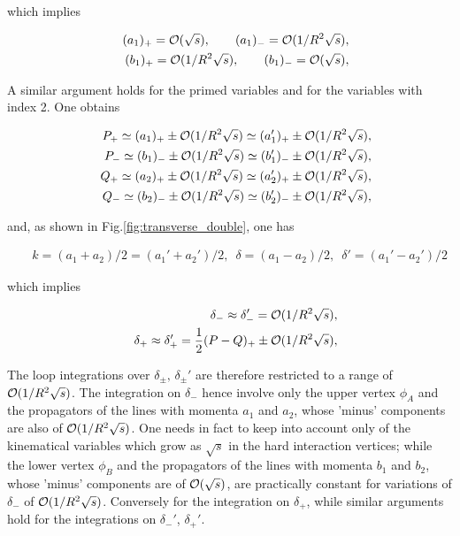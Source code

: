 \documentclass{ws-rv9x6}
\begin{document}
\noindent which implies

\begin{eqnarray}
&&(a_1)_+={\cal O}(\sqrt s), \qquad (a_1)_-={\cal O}(1/R^2\sqrt s),\nonumber\\
&&(b_1)_+={\cal O}(1/R^2\sqrt s), \qquad (b_1)_-={\cal O}(\sqrt s),
\end{eqnarray}

\noindent A similar argument holds for the primed variables and for the variables with index 2. One obtains

\begin{eqnarray}
&&P_+\simeq(a_1)_+\pm{\cal O}(1/R^2\sqrt s)\simeq (a_1')_+\pm{\cal O}(1/R^2\sqrt s),\nonumber\\
&&P_-\simeq(b_1)_-\pm{\cal O}(1/R^2\sqrt s)\simeq (b_1')_-\pm{\cal O}(1/R^2\sqrt s),\nonumber\\
&&Q_+\simeq(a_2)_+\pm{\cal O}(1/R^2\sqrt s)\simeq (a_2')_+\pm{\cal O}(1/R^2\sqrt s),\nonumber\\
&&Q_-\simeq(b_2)_-\pm{\cal O}(1/R^2\sqrt s)\simeq (b_2')_-\pm{\cal O}(1/R^2\sqrt s),
\end{eqnarray}

\noindent and, as shown in Fig.\ref{fig:transverse_double}, one has

\begin{eqnarray}
&&k=(a_1+a_2)/2=(a_1'+a_2')/2,\,\,\,\delta=(a_1-a_2)/2,\,\,\,\delta'=(a_1'-a_2')/2\nonumber
\end{eqnarray}

\noindent which implies

\begin{eqnarray}
&&\delta_-\approx\delta_-'={\cal O}(1/R^2\sqrt s),\nonumber\\
&&\delta_+\approx\delta_+'=\frac{1}{2}(P-Q)_+\pm{\cal O}(1/R^2\sqrt s),
\label{delta}
\end{eqnarray}

\noindent
The loop integrations over $\delta_{\pm},\,\delta_{\pm}'$ are therefore restricted to a range of ${\cal O}(1/R^2\sqrt s)$. The integration on $\delta_-$ hence involve only the upper vertex $\phi_A$ and the propagators of the lines with momenta $a_1$ and $a_2$, whose 'minus' components are also of ${\cal O}(1/R^2\sqrt s)$.  One needs in fact to keep into account only of the kinematical variables which grow as $\sqrt s$ in the hard interaction vertices; while the lower vertex $\phi_B$ and the propagators of the lines with momenta $b_1$ and $b_2$, whose 'minus' components are of ${\cal O}(\sqrt s)$, are practically constant for variations of $\delta_-$ of ${\cal O}(1/R^2\sqrt s)$. Conversely for the integration on $\delta_+$, while similar arguments hold for the integrations on $\delta_-'$, $\delta_+'$.
\end{document}

